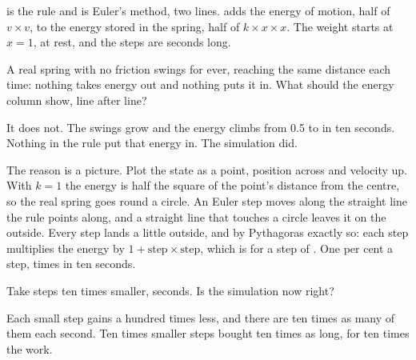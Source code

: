 
\noindent
{} is the rule and  is Euler's method, two lines.
 adds the energy of motion, half of $v \times v$, to the energy
stored in the spring, half of $k \times x \times x$. The weight starts at
$x = 1$, at rest, and the steps are  seconds long.


\begin{think}
A real spring with no friction swings for ever, reaching the same distance
each time: nothing takes energy out and nothing puts it in. What should the
energy column show, line after line?
\end{think}


\noindent
It does not. The swings grow and the energy climbs from \num{0.5} to
 in ten seconds. Nothing in the rule put that
energy in. The simulation did.

The reason is a picture. Plot the state as a point, position across and
velocity up. With $k = 1$ the energy is half the square of the point's
distance from the centre, so the real spring goes round a circle. An Euler
step moves along the straight line the rule points along, and a straight line
that touches a circle leaves it on the outside. Every step lands a little
outside, and by Pythagoras exactly so: each step multiplies the energy by
$1 + \text{step} \times \text{step}$, which is  for a
step of . One per cent a step, 
times in ten seconds.

\begin{think}
Take steps ten times smaller,  seconds. Is the simulation
now right?
\end{think}
Each small step gains a hundred times less, and there are ten times as many
of them each second. Ten times smaller steps bought ten times as long, for
ten times the work.

